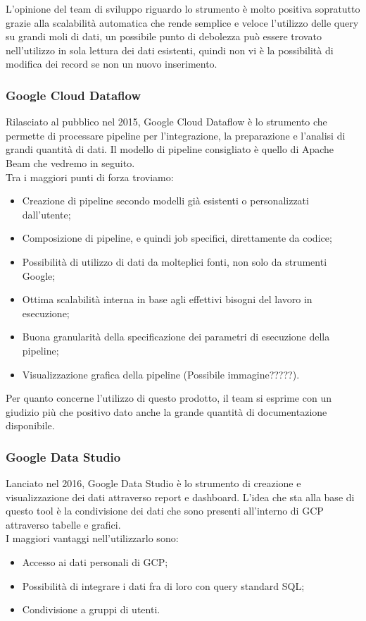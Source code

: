 L'opinione del team di sviluppo riguardo lo strumento è molto positiva sopratutto grazie alla scalabilità automatica che rende semplice e veloce l'utilizzo delle query su grandi moli di dati, un possibile punto di debolezza può essere trovato nell'utilizzo in sola lettura dei dati esistenti, quindi non vi è la possibilità di modifica dei record se non un nuovo inserimento.
\subsubsection{Google Cloud Dataflow}
Rilasciato al pubblico nel 2015, Google Cloud Dataflow è lo strumento che permette di processare pipeline per l'integrazione, la preparazione e l'analisi di grandi quantità di dati.
Il modello di pipeline consigliato è quello di Apache Beam che vedremo in seguito.
\\ Tra i maggiori punti di forza troviamo:
\begin{itemize}
	\item Creazione di pipeline secondo modelli già esistenti o personalizzati dall'utente;
	\item Composizione di pipeline, e quindi job specifici, direttamente da codice;
	\item Possibilità di utilizzo di dati da molteplici fonti, non solo da strumenti Google;
	\item Ottima scalabilità interna in base agli effettivi bisogni del lavoro in esecuzione;
	\item Buona granularità della specificazione dei parametri di esecuzione\cite{parametridiesecuzione} della pipeline;
	\item Visualizzazione grafica della pipeline (Possibile immagine?????). 
\end{itemize}
Per quanto concerne l'utilizzo di questo prodotto, il team si esprime con un giudizio più che positivo dato anche la grande quantità di documentazione disponibile.
\subsubsection{Google Data Studio}
Lanciato nel 2016, Google Data Studio\cite{GoogleDataStudio} è lo strumento di creazione e visualizzazione dei dati attraverso report e dashboard. L'idea che sta alla base di questo tool è la condivisione dei dati che sono presenti all'interno di GCP attraverso tabelle e grafici.
\\ I maggiori vantaggi nell'utilizzarlo sono:
\begin{itemize}
	\item Accesso ai dati personali di GCP;
	\item Possibilità di integrare i dati fra di loro con query standard SQL;
	\item Condivisione a gruppi di utenti. 
\end{itemize}

